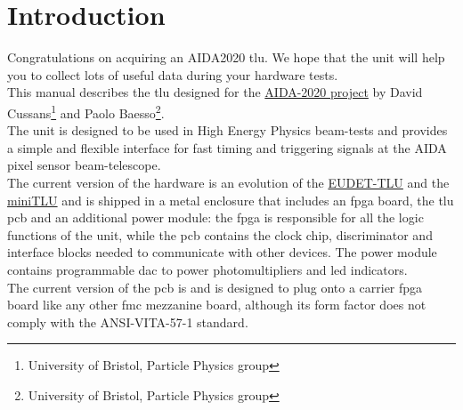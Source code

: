 \chapter{Introduction}\label{ch:introduction}
Congratulations on acquiring an AIDA2020 \gls{tlu}. We hope that the unit will help you to collect lots of useful data during your hardware tests.\\
This manual describes the \gls{tlu} designed for the \href{http://aida2020.web.cern.ch/}{AIDA-2020 project} by David Cussans\footnote{University of Bristol, Particle Physics group} and Paolo Baesso\footnote{University of Bristol, Particle Physics group}.\\
The unit is designed to be used in High Energy Physics beam-tests and provides a simple and flexible interface for fast timing and triggering signals at the AIDA pixel sensor beam-telescope.\\
The current version of the hardware is an evolution of the \href{https://twiki.cern.ch/twiki/bin/view/MimosaTelescope/TLU}{EUDET-TLU} and the \href{https://www.ohwr.org/projects/fmc-mtlu/wiki}{miniTLU} and is shipped in a metal enclosure that includes an \gls{fpga} board, the \gls{tlu} \gls{pcb} and an additional power module: the \gls{fpga} is responsible for all the logic functions of the unit, while the \gls{pcb} contains the clock chip, discriminator and interface blocks needed to communicate with other devices. The power module contains programmable \gls{dac} to power photomultipliers and \gls{led} indicators.\\
The current version of the \gls{pcb} is \brd and is designed to plug onto a carrier \gls{fpga} board like any other \gls{fmc} mezzanine board, although its form factor does not comply with the ANSI-VITA-57-1 standard.\\

